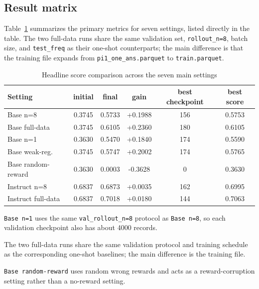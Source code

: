 \documentclass[12pt,a4paper]{ctexart}
\begin{document}
\subsection{Result matrix}

Table~\ref{tab:en-main-results} summarizes the primary metrics for seven settings, listed directly in the table. The two full-data runs share the same validation set, \texttt{rollout\_n=8}, batch size, and \texttt{test\_freq} as their one-shot counterparts; the main difference is that the training file expands from \texttt{pi1\_one\_ans.parquet} to \texttt{train.parquet}.

\begin{table}[H]
    \centering
    \caption{Headline score comparison across the seven main settings}
    \label{tab:en-main-results}
    \begin{threeparttable}
    \begin{tabular}{lccccc}
        \toprule
        Setting & initial & final & gain & best checkpoint & best score \\
        \midrule
        Base n=8 & 0.3745 & 0.5733 & +0.1988 & 156 & 0.5753 \\
        Base full-data\tnote{b} & 0.3745 & 0.6105 & +0.2360 & 180 & 0.6105 \\
        Base n=1\tnote{a} & 0.3630 & 0.5470 & +0.1840 & 174 & 0.5590 \\
        Base weak-reg. & 0.3745 & 0.5747 & +0.2002 & 174 & 0.5765 \\
        Base random-reward\tnote{c} & 0.3630 & 0.0003 & -0.3628 & 0 & 0.3630 \\
        Instruct n=8 & 0.6837 & 0.6873 & +0.0035 & 162 & 0.6995 \\
        Instruct full-data\tnote{b} & 0.6837 & 0.7018 & +0.0180 & 144 & 0.7063 \\
        \bottomrule
    \end{tabular}
    \begin{tablenotes}[flushleft]
        \footnotesize
        \item[a] \texttt{Base n=1} uses the same \texttt{val\_rollout\_n=8} protocol as \texttt{Base n=8}, so each validation checkpoint also has about 4000 records.
        \item[b] The two full-data runs share the same validation protocol and training schedule as the corresponding one-shot baselines; the main difference is the training file.
        \item[c] \texttt{Base random-reward} uses random wrong rewards and acts as a reward-corruption setting rather than a no-reward setting.
    \end{tablenotes}
    \end{threeparttable}
\end{table}
\end{document}
